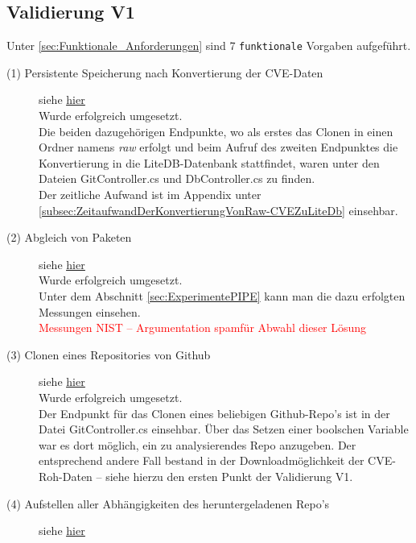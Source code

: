 \subsection{Validierung V1} \label{sec:Vali1}
    Unter \ref{sec:Funktionale_Anforderungen}  sind 7 \texttt{funktionale} Vorgaben aufgeführt.
    
    \begin{description}
        \item[(1) Persistente Speicherung nach Konvertierung der \ac{CVE}-Daten] siehe \hyperref[f:one]{\underline{hier}} \hfill \\
            Wurde erfolgreich umgesetzt.
            \\
            Die beiden dazugehörigen Endpunkte, wo als erstes das Clonen in einen Ordner namens \textit{raw} erfolgt und beim Aufruf des zweiten Endpunktes die Konvertierung in die LiteDB-Datenbank stattfindet, waren unter den Dateien GitController.cs und DbController.cs zu finden.
            \\
            Der zeitliche Aufwand ist im Appendix unter \ref{subsec:ZeitaufwandDerKonvertierungVonRaw-CVEZuLiteDb} einsehbar.
        \item[(2) Abgleich von Paketen] siehe \hyperref[f:two]{\underline{hier}} \hfill \\
            Wurde erfolgreich umgesetzt.
            \\
            Unter dem Abschnitt \ref{sec:ExperimentePIPE}  kann man die dazu erfolgten Messungen einsehen.
            \\
            \textcolor{red}{Messungen NIST -- Argumentation \glqq spam\grqq für Abwahl dieser Lösung}
        \item[(3) Clonen eines Repositories von Github] siehe \hyperref[f:three]{\underline{hier}} \hfill \\
            Wurde erfolgreich umgesetzt.
            \\
            Der Endpunkt für das Clonen eines beliebigen Github-Repo's ist in der Datei GitController.cs einsehbar.
            Über das Setzen einer boolschen Variable war es dort möglich, ein zu analysierendes Repo anzugeben.
            Der entsprechend andere Fall bestand in der Downloadmöglichkeit der \ac{CVE}-Roh-Daten -- siehe hierzu den ersten Punkt der Validierung V1.
        \item[(4) Aufstellen aller Abhängigkeiten des heruntergeladenen Repo's] siehe \hyperref[f:four]{\underline{hier}} \hfill \\

\end{description}
